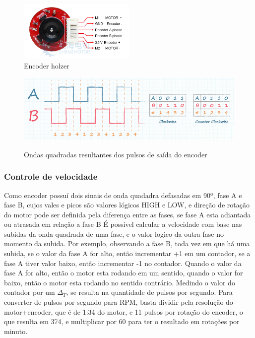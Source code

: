 \begin{figure}[ht]
	\centering
	\caption{Encoder holzer}
	\includegraphics[width=0.5\textwidth]{figures/encoder_holzer}
\end{figure}

\begin{figure}[ht]
	\centering
	\caption{Ondas quadradas resultantes dos pulsos de saída do encoder}
	\includegraphics[width=1\textwidth]{figures/encoder_pulso_ab}
	\label{encoder_ppr_ab}
\end{figure}


\subsubsection{Controle de velocidade}


Como encoder possuí dois sinais de onda quadadra defasadas em 90º, fase A e fase B, cujos vales e picos são valores lógicos HIGH e LOW, 
e direção de rotação do motor pode ser definida pela diferença entre as fases, se fase A esta adiantada ou atrasada em relação a fase B
É possível calcular a velocidade com base nas subidas da onda quadrada de uma fase, e o valor logico da outra fase no momento da subida.
Por exemplo,  observando a fase B, toda vez em que há uma subida, se o valor da fase A for alto, então incrementar +1 em um contador, se a fase A tiver valor baixo, então incrementar -1 no contador.
Quando o valor da fase A for alto, então o motor esta rodando em um sentido,  quando o valor  for baixo, então o motor esta rodando no sentido contrário.
Medindo o valor do contador por um $\Delta_{T}$, se resulta na quantidade de pulsos por segundo.
Para converter de pulsos por segundo para RPM, basta dividir pela resolução do motor+encoder,  que é de 1:34 do motor, e 11 pulsos por rotação do encoder, o que resulta em 374,
e multiplicar por 60 para ter o resultado em rotações por minuto.

